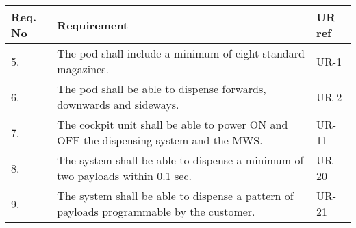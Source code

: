 \begin{center}
    \begin{tabular}{ | l | p{9cm} | l | }
    \hline
    Req. No & Requirement  & UR ref \\ \hline
    5. & The pod shall include a minimum of eight standard magazines. & UR-1 \\ \hline
    6. & The pod shall be able to dispense forwards, downwards and sideways. & UR-2 \\ \hline
    7. & The cockpit unit shall be able to power ON and OFF the dispensing system and the MWS. & UR-11 \\ \hline
    8. & The system shall be able to dispense a minimum of two payloads within 0.1 sec. & UR-20 \\ \hline
    9. & The system shall be able to dispense a pattern of payloads programmable by the customer. & UR-21 \\ \hline
    \end{tabular}
\end{center} 